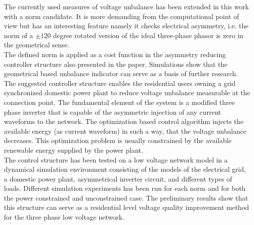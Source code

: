     The currently used measures of voltage unbalance has been extended in this work with a norm candidate. It is more demanding from the computational point of view but has an interesting feature namely it checks electrical asymmetry, i.e. the norm of a $\pm120$ degree  rotated version of the ideal three-phase phasor is zero in the geometrical sense.\\
    The defined norm is applied as a cost function in the asymmetry reducing controller structure also presented in the paper. Simulations show that the geometrical based unbalance indicator can serve as a basis of further research. The suggested controller structure enables the residential users owning a grid synchronized domestic power plant to reduce voltage unbalance measurable at the connection point. The fundamental element of the system is a modified three phase inverter that is capable of the asymmetric injection of any current waveforms to the network. The optimization based control algorithm injects the available energy (as current waveform) in such a way, that the voltage unbalance decreases. This optimization problem is usually constrained by the available renewable energy supplied by the power plant.\\
    The control structure has been tested on a low voltage network model in a dynamical simulation environment consisting of the models of the electrical grid, a domestic power plant,  asymmetrical inverter circuit, and different types of loads. Different simulation experiments has been run for each norm and for both the power constrained and unconstrained case. The preliminary results show that this structure can serve as a residential level voltage quality improvement method for the three phase low voltage network.

